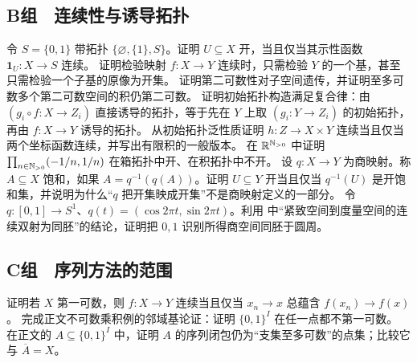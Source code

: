 \subsection*{B组　连续性与诱导拓扑}
\begin{enumerate}[label=\textbf{\thechapter.\arabic*.},resume]
 令 \(S=\{0,1\}\) 带拓扑 \(\{\varnothing,\{1\},S\}\)。证明 \(U\subseteq X\) 开，当且仅当其示性函数 \(\mathbf1_U:X\to S\) 连续。
 证明检验映射 \(f:X\to Y\) 连续时，只需检验 \(Y\) 的一个基，甚至只需检验一个子基的原像为开集。
 证明第二可数性对子空间遗传，并证明至多可数多个第二可数空间的积仍第二可数。
 证明初始拓扑构造满足复合律：由 \((g_i\circ f:X\to Z_i)\) 直接诱导的拓扑，等于先在 \(Y\) 上取 \((g_i:Y\to Z_i)\) 的初始拓扑，再由 \(f:X\to Y\) 诱导的拓扑。
 从初始拓扑泛性质证明 \(h:Z\to X\times Y\) 连续当且仅当两个坐标函数连续，并写出有限积的一般版本。
 在 \(\mathbb{R}^{\mathbb{N}_{>0}}\) 中证明 \(\prod_{n\in\mathbb{N}_{>0}}(-1/n,1/n)\) 在箱拓扑中开、在积拓扑中不开。
 设 \(q:X\to Y\) 为商映射。称 \(A\subseteq X\) 饱和，如果 \(A=q^{-1}(q(A))\)。证明 \(U\subseteq Y\) 开当且仅当 \(q^{-1}(U)\) 是开饱和集，并说明为什么“\(q\) 把开集映成开集”不是商映射定义的一部分。
 令 \(q:[0,1]\to S^1\)、\(q(t)=(\cos2\pi t,\sin2\pi t)\)。利用
 中“紧致空间到度量空间的连续双射为同胚”的结论，证明把 \(0,1\) 识别所得商空间同胚于圆周。
\end{enumerate}

\subsection*{C组　序列方法的范围}
\begin{enumerate}[label=\textbf{\thechapter.\arabic*.},resume]
 证明若 \(X\) 第一可数，则 \(f:X\to Y\) 连续当且仅当 \(x_n\to x\) 总蕴含 \(f(x_n)\to f(x)\)。
 完成正文不可数乘积例的邻域基论证：证明 \(\{0,1\}^{I}\) 在任一点都不第一可数。
 在正文的 \(A\subseteq\{0,1\}^{I}\) 中，证明 \(A\) 的序列闭包仍为“支集至多可数”的点集；比较它与 \(\overline A=X\)。
\end{enumerate}
